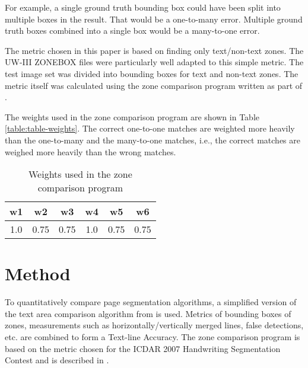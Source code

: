 \documentclass[conference]{IEEEtran}
\begin{document}
For example, a single ground truth bounding box could have been split into
multiple boxes in the result. That would be a one-to-many error. Multiple
ground truth boxes combined into a single box would be a many-to-one error.

The metric chosen in this paper is based on finding only text/non-text zones.
The UW-III ZONEBOX files were particularly well adapted to this simple
metric. The \cite{winder2010extending} test image set was divided into bounding
boxes for text and non-text zones.  The metric itself was calculated using the
zone comparison program written as part of \cite{winder2010extending}. 


The weights used in the zone comparison program are shown in Table
\ref{table:table-weights}. The correct one-to-one matches are weighted more
heavily than the one-to-many and the many-to-one matches, i.e., the correct
matches are weighed more heavily than the wrong matches.

\begin{table}
\begin{center}
\caption{Weights used in the zone comparison program}
\label{table:table-weights}
\label{table-weights}
\begin{tabular}{|c|c|c|c|c|c|}
\hline
  w1 & w2 & w3 & w4 & w5 & w6 \\
 \hline
  1.0  & 0.75 & 0.75 & 1.0 & 0.75 & 0.75 \\
\hline
\end{tabular}
\end{center}
\end{table}


\section{Method}

To quantitatively compare page segmentation algorithms, a simplified version of
the text area comparison algorithm from \cite{phillips1999empirical} is used.
Metrics of bounding boxes of zones, measurements such as
horizontally/vertically merged lines, false detections, etc. are combined to
form a Text-line Accuracy.  The zone comparison program is based on the
metric chosen for the ICDAR 2007 Handwriting Segmentation Contest and is
described in \cite{antonacopoulos2007page}.
\end{document}

